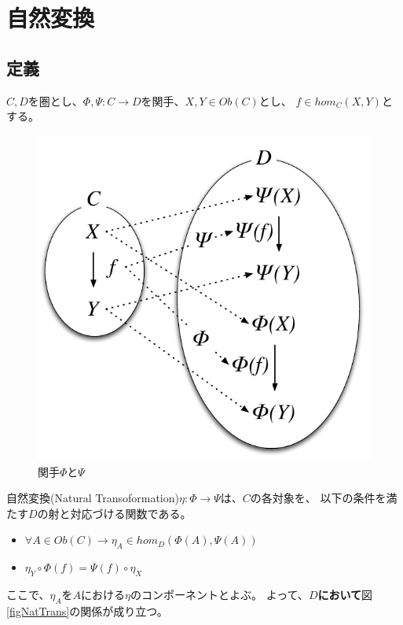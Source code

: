 
\newpage

\section{自然変換}
\subsection{定義}
$C, D$を圏とし、$\Phi,\Psi:C\to D$を関手、$X,Y\in Ob(C)$とし、
$f\in hom_C(X,Y)$とする。

\begin{figure}[htbp]
    \centering
    \includegraphics{diag_nt.pdf}
    \caption{関手$\Phi$と$\Psi$}
\end{figure}

自然変換(Natural Transoformation)$\eta:\Phi\to\Psi$は、$C$の各対象を、
以下の条件を満たす$D$の射と対応づける関数である。
\begin{itemize}
    \item $\forall A\in Ob(C)\to \eta_A\in hom_D(\Phi(A),\Psi(A))$
    \item $\eta_Y\circ \Phi(f)=\Psi(f)\circ\eta_X$
\end{itemize}
ここで、$\eta_A$を$A$における$\eta$のコンポーネントとよぶ。
よって、\textbf{$D$において}図\ref{figNatTrans}の関係が成り立つ。

